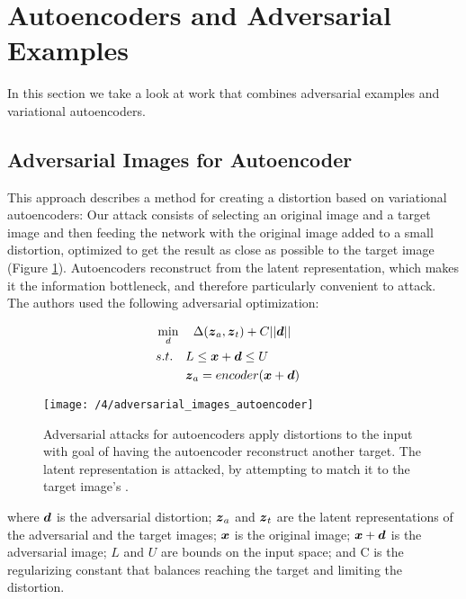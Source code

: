 \section{Autoencoders and Adversarial Examples}\label{sec:combining}
In this section we take a look at work that combines adversarial examples and
variational autoencoders.

\subsection{Adversarial Images for Autoencoder}
This approach \cite{tabacof2016adversarial} describes a method for creating a
distortion based on variational autoencoders: Our attack consists of selecting
an original image and a target image and then feeding the network with the
original image added to a small distortion, optimized to get the result as close
as possible to the target image (Figure
\ref{fig:adversarial_images_autoencoder}). Autoencoders reconstruct from the
latent representation, which makes it the information bottleneck, and therefore
particularly convenient to attack. The authors used the following adversarial
optimization:
    
\begin{align}
    & \min_{d} \quad \Delta(\boldsymbol{z}_{a}, \boldsymbol{z}_{t}) + C||\boldsymbol{d}|| && \\
    & s.t. \quad  
        \begin{aligned}[t]
            & L \leq \boldsymbol{x} + \boldsymbol{d} \leq U \\
            & \boldsymbol{z}_a = encoder(\boldsymbol{x} + \boldsymbol{d})
        \end{aligned}
\end{align}

\begin{figure}
	\centering
	\texttt{[image: /4/adversarial\_images\_autoencoder]}
    \caption{Adversarial attacks for autoencoders apply distortions to the input
    with goal of having the autoencoder reconstruct another target. The latent
    representation is attacked, by attempting to match it to the target image's
    \cite{tabacof2016adversarial}.} 
	\label{fig:adversarial_images_autoencoder}
\end{figure}

where $\boldsymbol{d}$ is the adversarial distortion; $\boldsymbol{z}_{a}$ and
$\boldsymbol{z}_{t}$ are the latent representations of the adversarial and the target
images; $\boldsymbol{x}$ is the original image; $\boldsymbol{x} + \boldsymbol{d}$ is the
adversarial image; $L$ and $U$ are bounds on the input space; and C is the
regularizing constant that balances reaching the target and limiting the
distortion.

